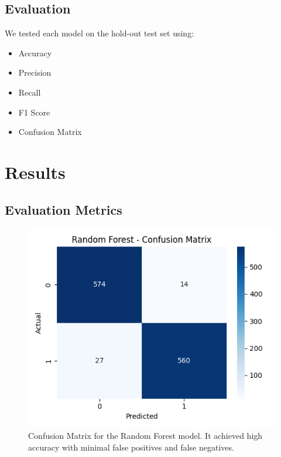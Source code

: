 \documentclass[conference]{IEEEtran}
\begin{document}
\subsection{Evaluation}
We tested each model on the hold-out test set using:
\begin{itemize}
    \item Accuracy
    \item Precision
    \item Recall
    \item F1 Score
    \item Confusion Matrix
\end{itemize}

\section{Results}

\subsection{Evaluation Metrics}

\begin{figure}[htbp]
\centerline{\includegraphics[width=\linewidth]{RF_CM.png}}
\caption{Confusion Matrix for the Random Forest model. It achieved high accuracy with minimal false positives and false negatives.}
\label{fig:rf_cm}
\end{figure}
\end{document}
